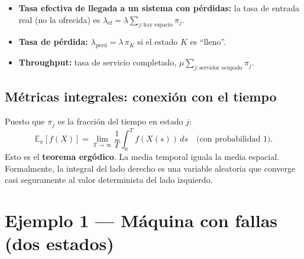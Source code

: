 \documentclass[11pt,a4paper]{article}
\theoremstyle{definition}
\theoremstyle{remark}
\newcommand{\E}{\mathbb{E}}
\begin{document}
\begin{itemize}[nosep]
  \item \textbf{Tasa efectiva de llegada a un sistema con pérdidas:}
    la tasa de entrada real (no la ofrecida) es
    $\lambda_{\text{ef}} = \lambda\sum_{j:\text{hay espacio}}\pi_j$.
  \item \textbf{Tasa de pérdida:} $\lambda_{\text{perd}} = \lambda\,\pi_K$
    si el estado $K$ es ``lleno''.
  \item \textbf{Throughput:} tasa de servicio completado,
    $\mu\sum_{j:\text{servidor ocupado}}\pi_j$.
\end{itemize}

\subsection{Métricas integrales: conexión con el tiempo}

Puesto que $\pi_j$ es la fracción del tiempo en estado $j$:
\[
  \E_\pi[f(X)] = \lim_{T\to\infty}\frac{1}{T}\int_0^T f(X(s))\,ds
  \quad\text{(con probabilidad 1).}
\]
Esto es el \textbf{teorema ergódico}.  La media temporal iguala la media
espacial.  Formalmente, la integral del lado derecho es una variable
aleatoria que converge casi seguramente al valor determinista del lado
izquierdo.

\section{Ejemplo 1 --- Máquina con fallas (dos estados)}
\end{document}
